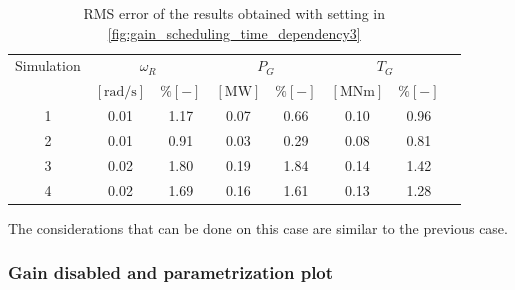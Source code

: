 \begin{table}[htb]
  \caption{RMS error of the results obtained with setting in \autoref{fig:gain_scheduling_time_dependency3}}
  \centering
  \begin{tabular}{cccccccc}
    \toprule
      Simulation & \multicolumn{2}{c}{$\omega_R$} & \multicolumn{2}{c}{$P_G$} & \multicolumn{2}{c}{$T_G$} \\ 
       & $\left[\si{\radian\per\second}\right]$ & $ \% \left[-\right]$ & $\left[\si{\mega\watt}\right]$ & $ \% \left[-\right]$ & $\left[\si{\mega\newton\meter} \right]$ & $ \% \left[-\right]$ \\ \midrule        
     1 & 0.01 &  1.17 &  0.07  &  0.66  &  0.10  &  0.96  \\
     2 & 0.01 &  0.91 &  0.03  &  0.29  &  0.08  &  0.81  \\
     3 & 0.02 &  1.80 &  0.19  &  1.84  &  0.14  &  1.42  \\
     4 & 0.02 &  1.69 &  0.16  &  1.61  &  0.13  &  1.28 \\ 
    
     \bottomrule
  \end{tabular}
  \label{tab:res_variable_gains3}
\end{table}

The considerations that can be done on this case are similar to the previous case. 

\subsubsection{Gain disabled and parametrization plot}\label{subsec:gain_disabled}

